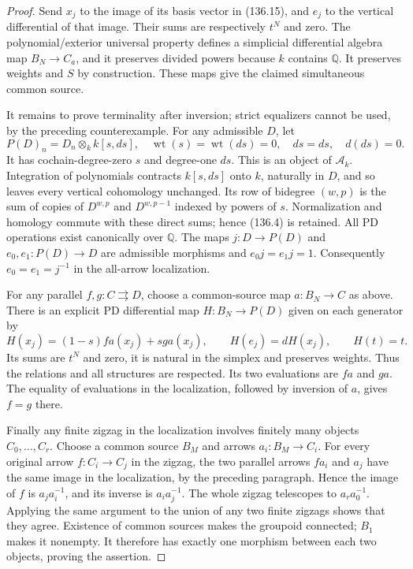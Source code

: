 \begin{proof}
Send $x_j$ to the image of its basis vector in
(136.15), and $e_j$ to the vertical differential
of that image.  Their sums are respectively
$t^N$ and zero.  The polynomial/exterior universal
property defines a simplicial differential algebra
map $B_N\to C_a$, and it preserves divided powers
because $k$ contains $\mathbb Q$.  It preserves
weights and $S$ by construction.  These maps give
the claimed simultaneous common source.

It remains to prove terminality after inversion;
strict equalizers cannot be used, by the preceding
counterexample.  For any admissible $D$, let
\[
 P(D)_n=D_n\otimes_k k[s,ds],\quad
 \operatorname{wt}(s)=\operatorname{wt}(ds)=0,
 \quad d s=ds,\quad d(ds)=0.                              \tag{136.16}
\]
It has cochain-degree-zero $s$ and degree-one $ds$.
This is an object of $\mathcal A_k$.  Integration of
polynomials contracts $k[s,ds]$ onto $k$, naturally
in $D$, and so leaves every vertical cohomology
unchanged.  Its row of bidegree $(w,p)$ is the sum
of copies of $D^{w,p}$ and $D^{w,p-1}$ indexed by
powers of $s$.  Normalization and homology commute
with these direct sums; hence (136.4) is retained.
All PD operations exist canonically over $\mathbb Q$.
The maps $j:D\to P(D)$ and
$e_0,e_1:P(D)\to D$ are admissible morphisms and
$e_0j=e_1j=1$.  Consequently $e_0=e_1=j^{-1}$ in
the all-arrow localization.

For any parallel $f,g:C\rightrightarrows D$, choose
a common-source map $a:B_N\to C$ as above.
There is an explicit PD differential map
$H:B_N\to P(D)$ given on each generator by
\[
 H(x_j)=(1-s)fa(x_j)+sga(x_j),\qquad H(e_j)=dH(x_j),
 \qquad H(t)=t.                                           \tag{136.17}
\]
Its sums are $t^N$ and zero, it is natural in the
simplex and preserves weights.  Thus the relations
and all structures are respected.  Its two
evaluations are $fa$ and $ga$.  The equality of
evaluations in the localization, followed by
inversion of $a$, gives $f=g$ there.

Finally any finite zigzag in the localization
involves finitely many objects $C_0,\ldots,C_r$.
Choose a common source $B_M$ and arrows
$a_i:B_M\to C_i$.  For every original arrow
$f:C_i\to C_j$ in the zigzag, the two parallel
arrows $fa_i$ and $a_j$ have the same image in
the localization, by the preceding paragraph.
Hence the image of $f$ is $a_j a_i^{-1}$, and
its inverse is $a_i a_j^{-1}$.  The whole zigzag
telescopes to $a_r a_0^{-1}$.  Applying the same
argument to the union of any two finite zigzags
shows that they agree.  Existence of common sources
makes the groupoid connected; $B_1$ makes it
nonempty.  It therefore has exactly one morphism
between each two objects, proving the assertion.
\end{proof}

